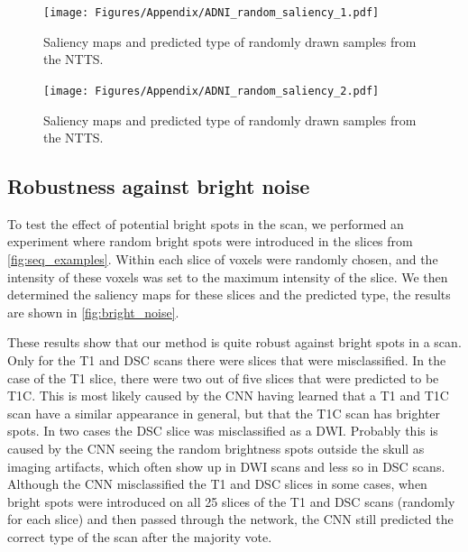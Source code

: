 \begin{subappendices}
\begin{figure}[ht]
    \centering
    \texttt{[image: Figures/Appendix/ADNI\_random\_saliency\_1.pdf]}

    \caption{Saliency maps and predicted \gls{type} of randomly drawn \glspl{sample} from the \gls{NTTS}.}
    \label{fig:random_adni_1}
\end{figure}

\begin{figure}[ht]
    \centering
    \texttt{[image: Figures/Appendix/ADNI\_random\_saliency\_2.pdf]}

    \caption{Saliency maps and predicted \gls{type} of randomly drawn \glspl{sample} from the \gls{NTTS}.}
    \label{fig:random_adni_2}
\end{figure}


\clearpage


\subsection{Robustness against bright noise}

To test the effect of potential bright spots in the \gls{scan}, we performed an experiment where random bright spots were introduced in the \glspl{slice} from \cref{fig:seq_examples}.
Within each \gls{slice}  of voxels were randomly chosen, and the intensity of these voxels was set to the maximum intensity of the \gls{slice}.
We then determined the saliency maps for these slices and the predicted \gls{type}, the results are shown in \cref{fig:bright_noise}.


These results show that our method is quite robust against bright spots in a \gls{scan}.
Only for the \gls{T1} and \gls{DSC} \glspl{scan} there were \glspl{slice} that were misclassified.
In the case of the \gls{T1} \gls{slice}, there were two out of five \glspl{slice} that were predicted to be \gls{T1C}.
This is most likely caused by the \gls{CNN} having learned that a \gls{T1} and \gls{T1C} \gls{scan} have a similar appearance in general, but that the \gls{T1C} \gls{scan} has brighter spots.
In two cases the \gls{DSC} \gls{slice} was misclassified as a \gls{DWI}.
Probably this is caused by the \gls{CNN} seeing the random brightness spots outside the skull as imaging artifacts, which often show up in \gls{DWI} \glspl{scan} and less so in \gls{DSC} \glspl{scan}.
Although the \gls{CNN} misclassified the \gls{T1} and \gls{DSC} \glspl{slice} in some cases, when bright spots were introduced on all 25 \glspl{slice} of the \gls{T1} and \gls{DSC} \glspl{scan} (randomly for each \gls{slice}) and then passed through the network, the \gls{CNN} still predicted the correct \gls{type} of the \gls{scan} after the majority vote.


\end{subappendices}
